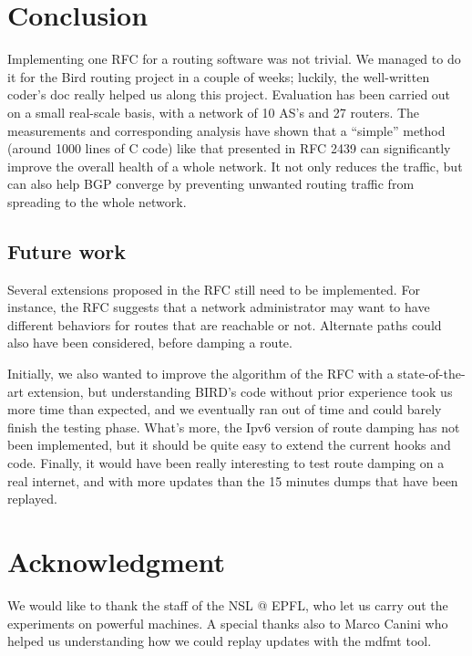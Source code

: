 \documentclass[a4paper,english]{IEEEtran}
\begin{document}
\section{Conclusion}

Implementing one RFC for a routing software was not trivial. We managed to do it for the Bird routing project 
in a couple of weeks; luckily, the well-written coder's doc\cite{codersdoc} really helped us along this project.
Evaluation has been carried out on a small real-scale basis, with a network of 10 AS's and 27 routers. 
The measurements and corresponding analysis have shown that a ``simple'' method (around 1000 lines of C code) 
like that presented in RFC 2439 can significantly improve the overall health of a whole network.
It not only reduces the traffic, but can also help BGP converge by preventing unwanted routing traffic from 
spreading to the whole network.

\subsection{Future work}

Several extensions proposed in the RFC still need to be implemented.
For instance, the RFC suggests that a network administrator may want to have different behaviors for routes that 
are reachable or not. Alternate paths could also have been considered, before damping a route.

Initially, we also wanted to improve the algorithm of the RFC with a state-of-the-art extension, but understanding 
BIRD's code without prior experience took us more time than expected, and we eventually ran
out of time and could barely finish the testing phase.
What's more, the Ipv6 version of route damping has not been implemented, but it should be quite easy to extend the current hooks and code.
Finally, it would have been really interesting to test route damping on a real internet, and with more updates
than the 15 minutes dumps that have been replayed.

\section*{Acknowledgment}
We would like to thank the staff of the NSL @ EPFL, who let us carry out the experiments on powerful machines. 
A special thanks also to Marco Canini who helped us understanding how we could replay updates with the mdfmt tool.
\end{document}
